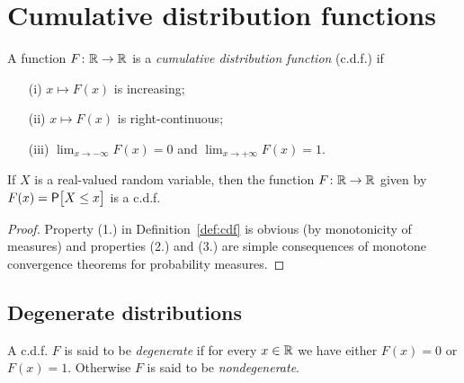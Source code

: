 \chapter{Cumulative distribution functions}

\begin{definition}
  \label{def:cdf}
  \leanok
  A function $F \colon \mathbb{R} \to \mathbb{R}$ is a
  \emph{cumulative distribution function} (c.d.f.) if
  \begin{enumerate}
  \item[(i)] $x \mapsto F(x)$ is increasing;
  \item[(ii)] $x \mapsto F(x)$ is right-continuous;
  \item[(iii)] $\lim_{x \to -\infty} F(x) = 0$ and $\lim_{x \to +\infty} F(x) = 1$.
  \end{enumerate}
\end{definition}

\begin{lemma}
  \label{lem:cdf-of-random-var}
  If $X$ is a real-valued random variable, then the function
  $F \colon \mathbb{R} \to \mathbb{R}$ given by $F(x) = \mathsf{P} \big[ X \le x \big]$ is a c.d.f.
\end{lemma}
\begin{proof}
  Property (1.) in Definition~\ref{def:cdf} is obvious (by monotonicity of measures)
  and properties (2.) and (3.) are simple consequences of monotone convergence
  theorems for probability measures.
\end{proof}

\section{Degenerate distributions}

\begin{definition}
  \label{def:degenerate-cdf}
  \leanok
  A c.d.f. $F$ is said to be
  \emph{degenerate} if for every $x \in \mathbb{R}$ we have either $F(x) = 0$ or $F(x) = 1$.
  Otherwise $F$ is said to be \emph{nondegenerate}.
\end{definition}

